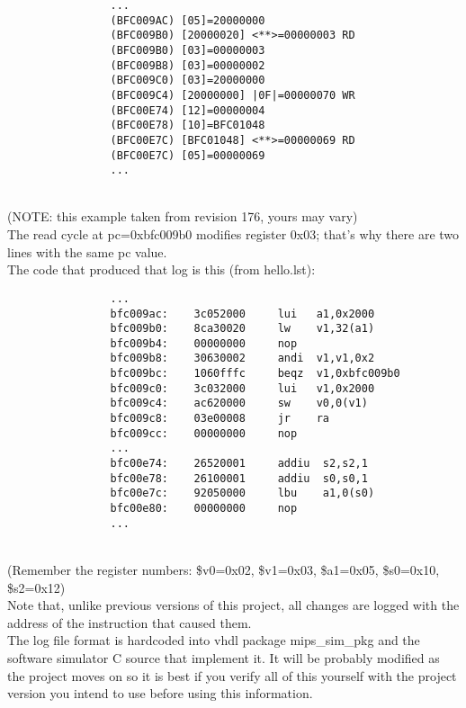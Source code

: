                 \begin{verbatim}
                ...
                (BFC009AC) [05]=20000000
                (BFC009B0) [20000020] <**>=00000003 RD
                (BFC009B0) [03]=00000003
                (BFC009B8) [03]=00000002
                (BFC009C0) [03]=20000000
                (BFC009C4) [20000000] |0F|=00000070 WR
                (BFC00E74) [12]=00000004
                (BFC00E78) [10]=BFC01048
                (BFC00E7C) [BFC01048] <**>=00000069 RD
                (BFC00E7C) [05]=00000069
                ...
                \end{verbatim}\\

    (NOTE: this example taken from revision 176, yours may vary)\\

    The read cycle at pc=0xbfc009b0 modifies register 0x03; that's why there 
    are two lines with the same pc value.\\

    The code that produced that log is this (from hello.lst):

                \begin{verbatim}
                ...
                bfc009ac:    3c052000     lui   a1,0x2000
                bfc009b0:    8ca30020     lw    v1,32(a1)
                bfc009b4:    00000000     nop
                bfc009b8:    30630002     andi  v1,v1,0x2
                bfc009bc:    1060fffc     beqz  v1,0xbfc009b0
                bfc009c0:    3c032000     lui   v1,0x2000
                bfc009c4:    ac620000     sw    v0,0(v1)
                bfc009c8:    03e00008     jr    ra
                bfc009cc:    00000000     nop
                ...
                bfc00e74:    26520001     addiu  s2,s2,1
                bfc00e78:    26100001     addiu  s0,s0,1
                bfc00e7c:    92050000     lbu    a1,0(s0)
                bfc00e80:    00000000     nop
                ...
                \end{verbatim}\\

    (Remember the register numbers: \$v0=0x02, \$v1=0x03, \$a1=0x05, \$s0=0x10, 
    \$s2=0x12)\\

    Note that, unlike previous versions of this project, all changes are logged
    with the address of the instruction that caused them.\\

    The log file format is hardcoded into vhdl package mips\_sim\_pkg
    and the software simulator C source that implement it. It will
    be probably modified as the project moves on so it is best if you verify
    all of this yourself with the project version you intend to use before 
    using this information.\\

